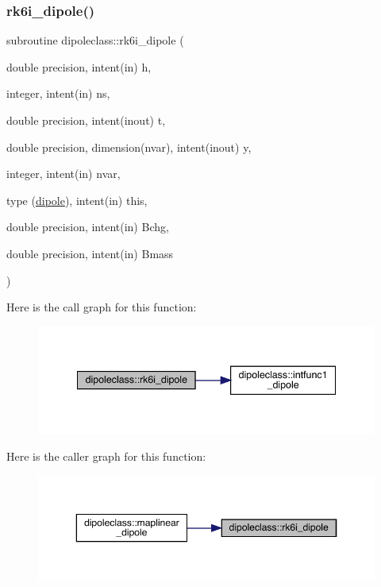 \subsubsection{\texorpdfstring{rk6i\_dipole()}{rk6i\_dipole()}}
{\footnotesize\ttfamily subroutine dipoleclass\+::rk6i\+\_\+dipole (\begin{DoxyParamCaption}\item[{double precision, intent(in)}]{h,  }\item[{integer, intent(in)}]{ns,  }\item[{double precision, intent(inout)}]{t,  }\item[{double precision, dimension(nvar), intent(inout)}]{y,  }\item[{integer, intent(in)}]{nvar,  }\item[{type (\mbox{\hyperlink{namespacedipoleclass_structdipoleclass_1_1dipole}{dipole}}), intent(in)}]{this,  }\item[{double precision, intent(in)}]{Bchg,  }\item[{double precision, intent(in)}]{Bmass }\end{DoxyParamCaption})}

Here is the call graph for this function\+:\nopagebreak
\begin{figure}[H]
\begin{center}
\leavevmode
\includegraphics[width=341pt]{namespacedipoleclass_a1a92cd51d6ad864d251dd3abdc361ba8_cgraph}
\end{center}
\end{figure}
Here is the caller graph for this function\+:\nopagebreak
\begin{figure}[H]
\begin{center}
\leavevmode
\includegraphics[width=350pt]{namespacedipoleclass_a1a92cd51d6ad864d251dd3abdc361ba8_icgraph}
\end{center}
\end{figure}
\mbox{\label{namespacedipoleclass_a88c00f58bdecf1b9c087e1fa6fe4d890}} 
